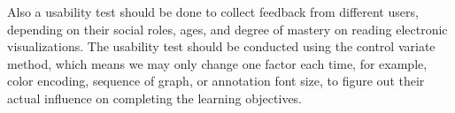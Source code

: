 \documentclass{article}
\begin{document}
\noindent
Also a usability test should be done to collect feedback from different users, depending on their social roles, ages, and degree of mastery on reading electronic visualizations. The usability test should be conducted using the control variate method, which means we may only change one factor each time, for example, color encoding, sequence of graph, or annotation font size, to figure out their actual influence on completing the learning objectives.
\end{document}
